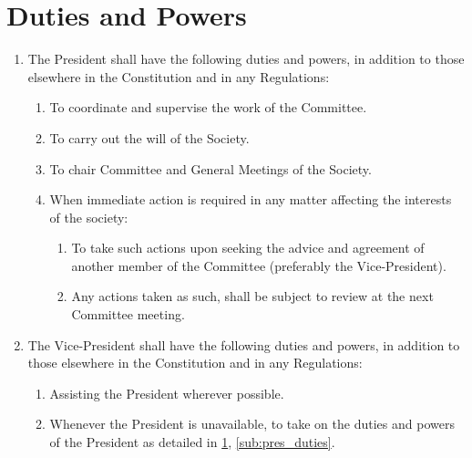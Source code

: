 \documentclass[a4paper]{article}
\begin{document}
\section{Duties and Powers} \label{sec:duties}
\begin{enumerate}
    \item The President shall have the following duties and powers, in addition to those elsewhere in the Constitution and in any Regulations: \label{sub:pres_duties}
    \begin{enumerate}
        \item To coordinate and supervise the work of the Committee.
        \item To carry out the will of the Society.
        \item To chair Committee and General Meetings of the Society.
        \item When immediate action is required in any matter affecting the interests of the society: \label{sub:exec_power}
        \begin{enumerate}
            \item To take such actions upon seeking the advice and agreement of another member of the Committee (preferably the Vice-President).
            \item Any actions taken as such, shall be subject to review at the next Committee meeting. 
        \end{enumerate}
    \end{enumerate}
    
    \item The Vice-President shall have the following duties and powers, in addition to those elsewhere in the Constitution and in any Regulations:
    \begin{enumerate}
        \item Assisting the President wherever possible. 
        \item Whenever the President is unavailable, to take on the duties and powers of the President as detailed in \cref{sec:duties}, \cref{sub:pres_duties}.
    \end{enumerate}
    

\end{enumerate}
\end{document}
